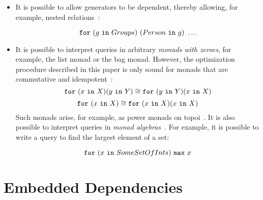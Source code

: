 \documentclass[preprint]{sigplanconf}
\newcommand{\FOR}{{\tt for} \ }
\newcommand{\IN}{ \ {\tt in} \ }
\begin{document}
\begin{itemize} 
\item  It is possible to allow generators to be dependent, thereby allowing, for example, nested relations~\cite{Popa99anequational}:
\begin{normalsize}
$$ \FOR (g \IN Groups) \ (Person \IN g) \ \ldots $$
\end{normalsize}
\item It is possible to interpret queries in arbitrary {\it monads with zeroes}, for example, the list monad or the bag monad.  However, the  optimization procedure described in this paper is only sound for monads that are commutative and idempotent~\cite{Popa99anequational}:
$$
\FOR (x \IN X)(y \IN Y)  \cong \FOR (y \IN Y) (x \IN X) 
$$
$$
\FOR (x \IN X) \cong \FOR (x \IN X)(x \IN X) 
$$
Such monads arise, for example, as power monads on topoi~\cite{BW}.  It is also possible to interpret queries in {\it monad algebras}~\cite{755736}.  For example, it is possible to write a query to find the largest element of a set: 
\begin{normalsize}
$$ \FOR (x \IN SomeSetOfInts) \ {\tt max} \ x $$
\end{normalsize}

\end{itemize}

\section{Embedded Dependencies}
\end{document}
